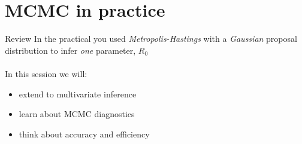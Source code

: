 \documentclass[compress]{beamer}
\begin{document}
\section{MCMC in practice}
\label{sec-8}
\begin{frame}[label=sec-8-1]{Review}
In the practical you used \textit{Metropolis-Hastings} with a \textit{Gaussian} proposal distribution to infer \textit{one} parameter, $R_0$\\~\\

In this session we will:
\begin{itemize}
\item extend to multivariate inference
\item learn about MCMC diagnostics
\item think about accuracy and efficiency
\end{itemize}
\end{frame}
\end{document}
